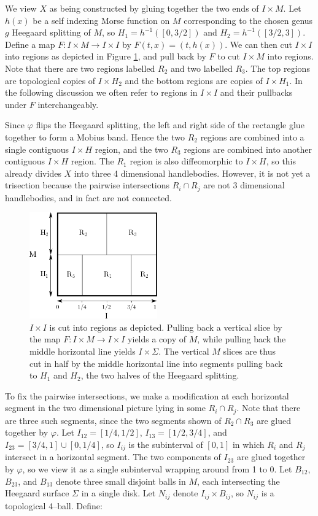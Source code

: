 \documentclass[12pt]{amsart}
\theoremstyle{definition}
\theoremstyle{remark}
\begin{document}
We view $X$ as being constructed by gluing together the two ends of $I \times M$.
Let $h(x)$ be a self indexing Morse function on $M$ corresponding to the chosen genus $g$ Heegaard splitting of $M$, so $H_1 = h^{-1}([0,3/2])$ and $H_2  = h^{-1}([3/2,3])$.
Define a map $F\colon I \times M \to I \times I$ by $F(t,x) = (t,h(x))$.
We can then cut $I \times I$ into regions as depicted in Figure \ref{flippablebreakdown}, and pull back by $F$ to cut $I \times M$ into regions.
Note that there are two regions labelled $R_2$ and two labelled $R_3$.
The top regions are topological copies of $I \times H_2$ and the bottom regions are copies of $I \times H_1$.
In the following discussion we often refer to regions in $I \times I$ and their pullbacks under $F$ interchangeably.

Since $\varphi$ flips the Heegaard splitting, the left and right side of the rectangle glue together to form a Mobius band.
Hence the two $R_2$ regions are combined into a single contiguous $I \times H$ region, and the two $R_3$ regions are combined into another contiguous $I \times H$ region.
The $R_1$ region is also diffeomorphic to $I \times H$, so this already divides $X$ into three 4 dimensional handlebodies.
However, it is not yet a trisection because the pairwise intersections $R_i \cap R_j$ are not 3 dimensional handlebodies, and in fact are not connected.

\begin{figure}[h]
\centering
\includegraphics[height=1.8in]{MxS1_flippable.png}
\caption{$I \times I$ is cut into regions as depicted.
Pulling back a vertical slice by the map $F\colon I \times M \to I \times I$ yields a copy of $M$, while pulling back the middle horizontal line yields $I \times \Sigma$.
The vertical $M$ slices are thus cut in half by the middle horizontal line into segments pulling back to $H_1$ and $H_2$, the two halves of the Heegaard splitting.}
\label{flippablebreakdown}
\end{figure}

To fix the pairwise intersections, we make a modification at each horizontal segment in the two dimensional picture lying in some $R_i \cap R_j$.
Note that there are three such segments, since the two segments shown of $R_2 \cap R_3$ are glued together by $\varphi$.
 Let $I_{12} = [1/4,1/2]$, $I_{13} = [1/2,3/4]$, and $I_{23} = [3/4,1] \cup [0,1/4]$, so $I_{ij}$ is the subinterval of $[0,1]$ in which $R_i$ and $R_j$ intersect in a horizontal segment.
The two components of $I_{23}$ are glued together by $\varphi$, so we view it as a single subinterval wrapping around from 1 to 0.
Let $B_{12}$, $B_{23}$, and $B_{13}$ denote three small disjoint balls in $M$, each intersecting the Heegaard surface $\Sigma$ in a single disk.
Let $N_{ij}$ denote $I_{ij} \times B_{ij}$, so $N_{ij}$ is a topological 4--ball.
Define:
\end{document}
